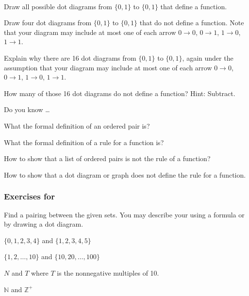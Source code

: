 \begin{exer}[\exerU] %
\label{exer_dot_diagram_notfn}   
~
    \begin{apart}
        \item Draw all possible dot diagrams from $\{0,1\}$ to $\{0,1\}$ that define a function.
        \item Draw four dot diagrams from $\{0,1\}$ to $\{0,1\}$ that do not define a function.  Note that your diagram may include at most one of each arrow $0 \to 0$, $0 \to 1$, $1 \to 0$, $1 \to 1$.  
        \item Explain why there are 16 dot diagrams from $\{0,1\}$ to $\{0,1\}$, again under the assumption that your diagram may include at most one of each arrow $0 \to 0$, $0 \to 1$, $1 \to 0$, $1 \to 1$.
        \item How many of those 16 dot diagrams do not define a function?  Hint: Subtract.
    \end{apart}
\end{exer}

\begin{exer}[\exerR] %
\label{exer_dyk_orderedpairs_defnfn}
    Do you know \ldots
        \begin{exerpart}
            \item What the formal definition of an ordered pair is?
            \item What the formal definition of a rule for a function is?
            \item How to show that a list of ordered pairs is not the rule of a function?
            \item How to show that a dot diagram or graph does not define the rule for a function.
        \end{exerpart}
\end{exer}


\subsubsection*{Exercises for  \subpairing}

\begin{exer}[\exerP] %
\label{exer_finite_pairing}
    Find a pairing between the given sets. You may describe your using a formula or by drawing a dot diagram.
        \begin{apart}
            \item $\{0,1,2,3,4\}$ and $\{1,2,3,4,5\}$
            \item $\{1,2,\ldots, 10\}$ and $\{10,20,\ldots,100\}$
            \item $N$ and $T$ where $T$ is the nonnegative multiples of 10.
            \item $\mathbb{N}$ and $\mathbb{Z}^+$
        \end{apart}
\end{exer}

